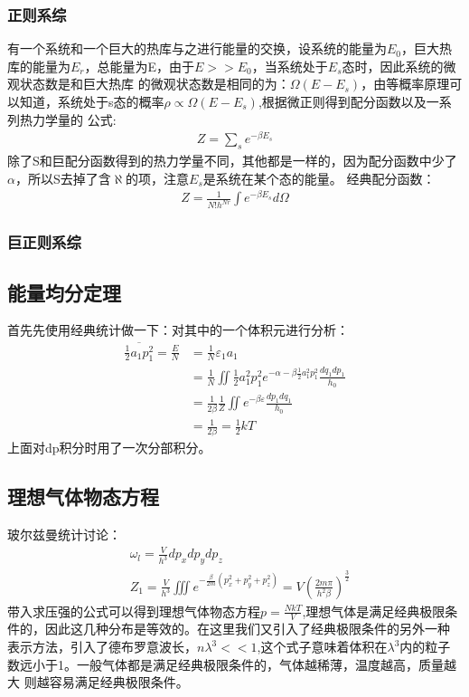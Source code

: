 \documentclass[UTF8]{ctexart}
\begin{document}
\subsubsection{正则系综}
有一个系统和一个巨大的热库与之进行能量的交换，设系统的能量为$E_0$，巨大热库的能量为$E_r$，总能量为E，由于$E>>E_0$，当系统处于$E_s$态时，因此系统的微观状态数是和巨大热库
的微观状态数是相同的为：$\Omega(E-E_s)$，由等概率原理可以知道，系统处于s态的概率$\rho \propto \Omega(E-E_s)$,根据微正则得到配分函数以及一系列热力学量的
公式:
\begin{align*}
        Z=\sum_s e^{-\beta E_s}
\end{align*}
除了S和巨配分函数得到的热力学量不同，其他都是一样的，因为配分函数中少了$\alpha$，所以S去掉了含$\aleph$的项，注意$E_s$是系统在某个态的能量。
经典配分函数：
\begin{align*}
        Z=\frac{1}{N! h^{Nr}}\int e^{-\beta E_s} d\Omega
\end{align*}
\subsubsection{巨正则系综}
\subsection{能量均分定理}
首先先使用经典统计做一下：对其中的一个体积元进行分析：
\begin{align*}
        \overline{\frac{1}{2}a_1 p_1^2} = \frac{E}{N} & =\frac{1}{N} \varepsilon_1 a_1                                                    \\
                                                      & = \frac{1}{N} \iint \frac{1}{2}a_1^2p_1^2 e^{-\alpha-\beta \frac{1}{2}a_1^2p_1^2}
        \frac{dq_1 dp_1}{h_0}                                                                                                             \\
                                                      & =\frac{1}{2\beta}\frac{1}{Z}\iint e^{-\beta\varepsilon} \frac{dp_1 dq_1}{h_0}     \\
                                                      & =\frac{1}{2\beta}=\frac{1}{2}kT
\end{align*}
上面对dp积分时用了一次分部积分。
\subsection{理想气体物态方程}
玻尔兹曼统计讨论：
\begin{align*}
         & \omega_l = \frac{V}{h^3}dp_x dp_y dp_z                                                                   \\
         & Z_1 = \frac{V}{h^3}\iiint e^{-\frac{\beta}{2m}(p_x^2+p_y^2+p_z^2)}=V(\frac{2m\pi}{h^2\beta})^\frac{3}{2}
\end{align*}
带入求压强的公式可以得到理想气体物态方程$ p = \frac{NkT}{V}$,理想气体是满足经典极限条件的，因此这几种分布是等效的。在这里我们又引入了经典极限条件的另外一种
表示方法，引入了德布罗意波长，$n\lambda^3<<1$,这个式子意味着体积在$\lambda^3$内的粒子数远小于1。一般气体都是满足经典极限条件的，气体越稀薄，温度越高，质量越大
则越容易满足经典极限条件。
\end{document}

